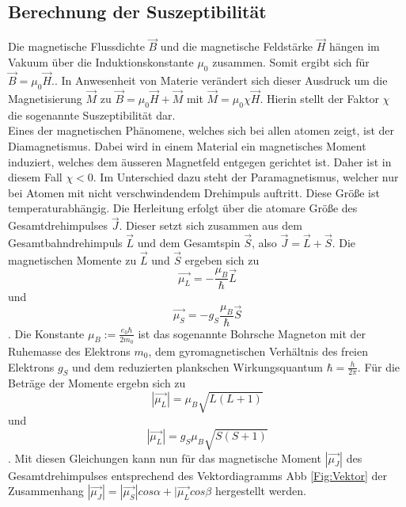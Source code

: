 \subsection{Berechnung der Suszeptibilität}
Die magnetische Flussdichte $\vec{B}$ und die magnetische Feldstärke $\vec{H}$ hängen im Vakuum über die Induktionskonstante $\mu_0$ zusammen. Somit ergibt sich für $\vec{B}=\mu_0\vec{H}$.. In Anwesenheit von Materie verändert sich dieser Ausdruck um die Magnetisierung $\vec{M}$ zu $\vec{B}=\mu_0\vec{H}+\vec{M}$ mit $\vec{M}=\mu_0\chi\vec{H}$. Hierin stellt der Faktor $\chi$ die sogenannte Suszeptibilität dar.\\
Eines der magnetischen Phänomene, welches sich bei allen atomen zeigt, ist der Diamagnetismus. Dabei wird in einem Material ein magnetisches Moment induziert, welches dem äusseren Magnetfeld entgegen gerichtet ist. Daher ist in diesem Fall $\chi<0$. Im Unterschied dazu steht der Paramagnetismus, welcher nur bei Atomen mit nicht verschwindendem Drehimpuls auftritt. Diese Größe ist temperaturabhängig. Die Herleitung erfolgt über die atomare Größe des Gesamtdrehimpulses $\vec{J}$. Dieser setzt sich zusammen aus dem Gesamtbahndrehimpuls $\vec{L}$ und dem Gesamtspin $\vec{S}$, also $\vec{J}=\vec{L}+\vec{S}$. Die magnetischen Momente zu $\vec{L}$ und $\vec{S}$ ergeben sich zu 
\begin{equation*}
    \vec{\mu_L}=-\frac{\mu_B}{\hbar}\vec{L}
\end{equation*}
und
\begin{equation*}
    \vec{\mu_S}=-g_S\frac{\mu_B}{\hbar}\vec{S}
\end{equation*}.
Die Konstante $\mu_B:=\frac{e_0\hbar}{2m_0}$ ist das sogenannte Bohrsche Magneton mit der Ruhemasse des Elektrons $m_0$, dem gyromagnetischen Verhältnis des freien Elektrons $g_S$ und dem reduzierten plankschen Wirkungsquantum $\hbar=\frac{h}{2\pi}$. Für die Beträge der Momente ergebn sich zu 
\begin{equation*}
    |\vec{\mu_L}|=\mu_B\sqrt{L(L+1)}
\end{equation*}
und
\begin{equation*}
    |\vec{\mu_L}|=g_S\mu_B\sqrt{S(S+1)}
\end{equation*}.
Mit diesen Gleichungen kann nun für das magnetische Moment $|\vec{\mu_J}|$ des Gesamtdrehimpulses entsprechend des Vektordiagramms Abb \ref{Fig:Vektor} der Zusammenhang $|\vec{\mu_J}|=|\vec{\mu_S}|cos\alpha+|\vec{\mu_L}cos\beta$ hergestellt werden.
